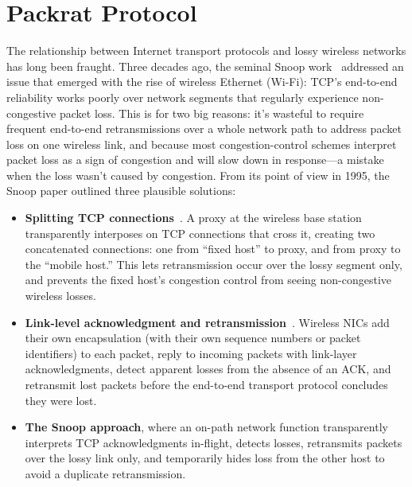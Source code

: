 \chapter{Packrat Protocol}
\label{sec:packrat}

The relationship between Internet transport protocols and lossy
wireless networks has long been fraught. Three decades ago, the
seminal Snoop work~\cite{balakrishnan1995snoop} addressed an issue
that emerged with the rise of wireless Ethernet (Wi-Fi): TCP's
end-to-end reliability works poorly over network segments that
regularly experience non-congestive packet loss. This is for two big
reasons: it's wasteful to require frequent end-to-end retransmissions
over a whole network path to address packet loss on one wireless link,
and because most congestion-control schemes interpret packet loss as a
sign of congestion and will slow down in response---a mistake when the
loss wasn't caused by congestion. From its point of view in 1995, the
Snoop paper outlined three plausible solutions:
\begin{itemize}[topsep=0pt,itemsep=0pt]
\item \textbf{Splitting TCP connections}~\cite{bakreitcp1994, bb95}. A
  proxy at the wireless base station transparently interposes on TCP
  connections that cross it, creating two concatenated connections:
  one from ``fixed host'' to proxy, and from proxy to the ``mobile
  host.'' This lets retransmission occur over the lossy segment only,
  and prevents the fixed host's congestion control from seeing
  non-congestive wireless losses.

\item \textbf{Link-level acknowledgment and
  retransmission}~\cite{palplus}. Wireless NICs add their own
  encapsulation (with their own sequence numbers or packet
  identifiers) to each packet, reply to incoming packets with
  link-layer acknowledgments, detect apparent losses from the absence
  of an ACK, and retransmit lost packets before the end-to-end
  transport protocol concludes they were lost.

\item \textbf{The Snoop approach}, where an on-path network function
  transparently interprets TCP acknowledgments in-flight, detects
  losses, retransmits packets over the lossy link only, and
  temporarily hides loss from the other host to avoid a duplicate
  retransmission.
\end{itemize}

